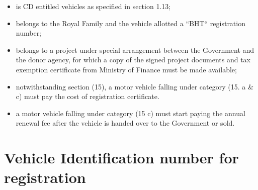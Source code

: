 \documentclass[
]{book}
\providecommand{\tightlist}{%
  \setlength{\itemsep}{0pt}\setlength{\parskip}{0pt}}
\begin{document}
\begin{itemize}
\tightlist
\item
  is CD entitled vehicles as specified in section 1.13;
\item
  belongs to the Royal Family and the vehicle allotted a ``BHT`` registration number;
\item
  belongs to a project under special arrangement between the Government and the donor agency, for which a copy of the signed project documents and tax exemption certificate from Ministry of Finance must be made available;
\item
  notwithstanding section (15), a motor vehicle falling under category (15. a \& c) must pay the cost of registration certificate.
\item
  a motor vehicle falling under category (15 c) must start paying the annual renewal fee after the vehicle is handed over to the Government or sold.
\end{itemize}

\hypertarget{vehicle-identification-number-for-registration}{%
\section{Vehicle Identification number for registration}\label{vehicle-identification-number-for-registration}}
\end{document}
